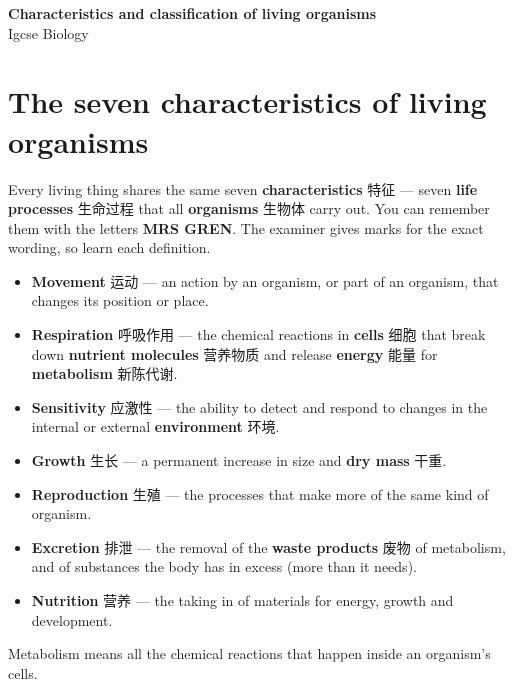 \documentclass[11pt]{article}
\begin{document}
\begin{center}
  {\LARGE\bfseries Characteristics and classification of living organisms}\\[0.35em]
  {\large Igcse Biology}
\end{center}
\vspace{0.6em}

\section*{The seven characteristics of living organisms}

Every living thing shares the same seven \textbf{characteristics} 特征 — seven \textbf{life processes} 生命过程 that all \textbf{organisms} 生物体 carry out. You can remember them with the letters \textbf{MRS GREN}. The examiner gives marks for the exact wording, so learn each definition.

\begin{itemize}
\item \textbf{Movement} 运动 — an action by an organism, or part of an organism, that changes its position or place.

\item \textbf{Respiration} 呼吸作用 — the chemical reactions in \textbf{cells} 细胞 that break down \textbf{nutrient molecules} 营养物质 and release \textbf{energy} 能量 for \textbf{metabolism} 新陈代谢.

\item \textbf{Sensitivity} 应激性 — the ability to detect and respond to changes in the internal or external \textbf{environment} 环境.

\item \textbf{Growth} 生长 — a permanent increase in size and \textbf{dry mass} 干重.

\item \textbf{Reproduction} 生殖 — the processes that make more of the same kind of organism.

\item \textbf{Excretion} 排泄 — the removal of the \textbf{waste products} 废物 of metabolism, and of substances the body has in excess (more than it needs).

\item \textbf{Nutrition} 营养 — the taking in of materials for energy, growth and development.

\end{itemize}

Metabolism means all the chemical reactions that happen inside an organism's cells.
\end{document}
